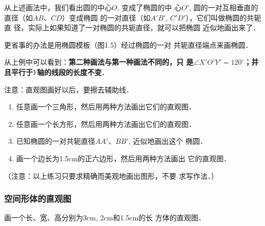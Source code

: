 \begin{example}
从上述画法中，我们看出圆的中心$O$, 变成了椭圆的中
心$O'$, 圆的一对互相垂直的直径（如$AB$、$CD$）变成椭圆
的一对直径（如$A'B'$, $C'D'$），它们叫做椭圆的共轭直
径，实际上如果知道了一对椭圆的共轭直径，就可以把椭圆
近似地画出来了．

更省事的办法是用椭圆模板（图1.5）经过椭圆的一对
共轭直径端点来画椭圆．
\begin{figure}[htp]
    \centering
{}
    \caption{}
\end{figure}

从上例中可以看到：\textbf{第二种画法与第一种画法不同的，只
是$\angle X'O'Y'=120^{\circ}$；并且平行于$Y$轴的线段的长度不变}．

注意：直观图画好以后，要擦去辅助线．
\end{example}

\begin{ex}
\begin{enumerate}
\item 任意画一个三角形，然后用两种方法画出它们的直观图．
\item 任意画一个长方形，然后用两种方法画出它们的直观图．
\item 已知椭圆的一对共轭直径$AA'$、$BB'$, 近似地画出这个
椭圆．
\item 画一个边长为1.5cm的正六边形，然后用两种方法画出
它的直观图．
\end{enumerate}

（注意：以上练习只要求精确而美观地画出图形，不要
求写作法．）
\end{ex}

\subsubsection{空间形体的直观图}
\begin{example}
    画一个长、宽、高分别为3cm, 2cm和1.5cm的长
方体的直观图．
\end{example}

